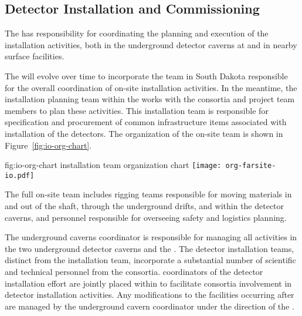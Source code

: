 \subsection{Detector Installation and Commissioning}  %
\label{sec:es-tc-det-instal}

The  has
responsibility for coordinating the planning and execution of 
the  installation activities, both 
in the underground detector caverns at  and in 
nearby surface facilities. 

The   will evolve over 
time to incorporate the team in South Dakota responsible for the 
overall coordination of on-site installation activities.  In the 
meantime, the installation planning team within the  works with 
the  consortia and  project team members 
to plan these activities.  This installation team is responsible for specification 
and procurement of common infrastructure items associated with 
installation of the detectors. 
The organization of the on-site team is 
shown in Figure~\ref{fig:io-org-chart}. 

\begin{dunefigure}{fig:io-org-chart}
  { installation team organization chart}
  \texttt{[image: org-farsite-io.pdf]}
\end{dunefigure}


The full on-site  team includes rigging teams responsible for moving 
materials in and out of the shaft, through the underground drifts, 
and within the detector caverns, and personnel responsible 
for overseeing safety and logistics planning. 

The underground caverns coordinator is responsible for managing all 
activities in the two underground detector caverns and the
. The detector installation teams, distinct from the   installation team, 
incorporate a substantial number of scientific and
technical personnel from the  consortia.   coordinators 
of the detector installation effort are jointly placed within 
  to facilitate consortia involvement in  
detector installation activities.  Any modifications to the facilities 
occurring after  are managed by the underground cavern 
coordinator under the direction of the .

